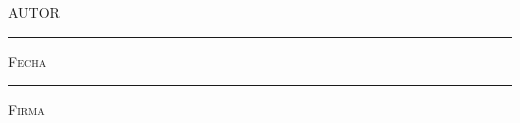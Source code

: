 \documentclass[11pt]{book}
\theoremstyle{definition}
\begin{document}

\thispagestyle{empty}
\vspace*{\fill}
\begingroup

\centering

\hspace{3em}

\textsc{AUTOR}

\vspace{5em}

\rule[1em]{20em}{0.5pt} %

\textsc{Fecha}
 
\vspace{8em}

\rule[1em]{20em}{0.5pt} %

\textsc{Firma}

\endgroup
\vspace*{\fill}



\pagestyle{empty}
\frontmatter







\end{document}
